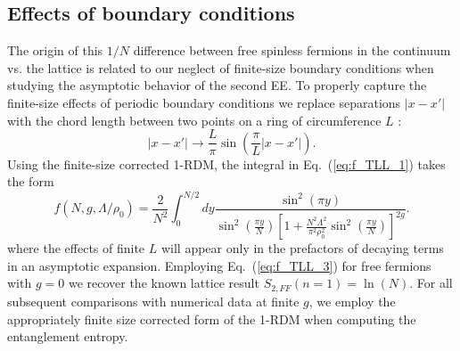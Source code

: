 \subsection{Effects of boundary conditions}

The origin of this $1/N$ difference between free spinless fermions in the
continuum vs. the lattice is related to our neglect of finite-size boundary
conditions when studying the asymptotic behavior of the second \ren EE.  To
properly capture the finite-size effects of periodic boundary conditions we
replace separations $\lvert x-x'\rvert$ with the chord length between two
points on a ring of circumference $L$ \cite{Cazalilla:2004}:
%
\begin{equation}
|x-x'| \rightarrow \frac{L}{\pi}\sin\left(\frac{\pi} {L}|x-x'|\right).
\end{equation}
%
Using the finite-size corrected 1-RDM, the integral in Eq.~(\ref{eq:f_TLL_1}) takes the form
%
\begin{equation}
    f(N,g,\Lambda/\rho_0)= \frac{2}{N^2}\int_{0}^{N/2} dy\frac{\sin^2(\pi
y)}{\sin^2(\frac{\pi
y}{N})\left[1+\frac{N^2\Lambda^2}{\pi^2\rho_0^2}\sin^2(\frac{\pi y}{N})\right]^{2g}}. 
\label{eq:f_TLL_3}
\end{equation}
%
where the effects of finite $L$ will appear only in the prefactors of 
decaying terms in an asymptotic expansion.  Employing Eq.~(\ref{eq:f_TLL_3})
for free fermions with $g=0$ we recover the known lattice result 
$S_{2,FF}(n=1)=\ln(N)$.  For all subsequent comparisons with numerical data at
finite $g$, we employ the appropriately finite size corrected form of the 1-RDM
when computing the \ren entanglement entropy.
%

